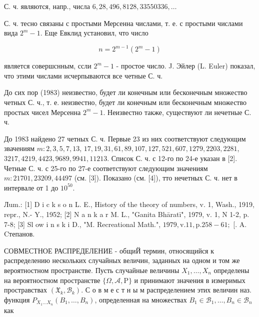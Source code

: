 \documentclass[10pt]{article}
\begin{document}
С. ч. являются, напр., числа $6,28,496,8128,33550336, \ldots$



С. ч. тесно связаны с простыми Мерсенна числами, т. е. с простыми числами вида $2^{m}-1$. Еще Евклид установил, что число



\[

n=2^{m-1}\left(2^{m}-1\right)

\]



является совершснным, ссли $2^{m}-1$ - простое число. J. Эйлер (L. Euler) показал, что этими числами исчерпываются все четные С. ч.



До сих пор (1983) неизвестно, будет ли конечным или бесконечным множество четных С. ч., т. е. неизвестно, будет ли конечным или бесконечным множество простых чисел Мерсенна $2^{m}-1$. Неизвестно также, существуют ли нечетные С. ч.



До 1983 найдено 27 четных С. ч. Первые 23 из них соответствуют следующим звачениям $m: 2,3,5,7,13$, $17,19,31,61,89,107,127,521,607,1279,2203,2281$, $3217,4219,4423,9689,9941,11213$. Список С. ч. с 12-го по 24-е указан в [2]. Четные С. ч. с 25-го по 27-е соответствуют следующим значениям $m: 21701,23209,44497$ (см. [3]). Показано (см. [4]), тто нечетных С. ч. нет в интервале от 1 до $10^{50}$.



Лum.: [1] D i c k s o n L. E., History of the theory of numbers, v. 1, Wash., 1919, repr., N.- Y., 1952; [2] N a n k a r M. L., "Ganita Bhāratī", 1979, v. 1, N 1-2, p. 7-8; [3] Sl ow i n s k i D., "M. Recreational Math.", $1979, \mathrm{v} .11, \mathrm{p} .258-61 ;$ [. A. Cтепанов.



СОВМЕСТНОЕ РАСПРЕДЕЛЕНИЕ - общиЙ термин, относящийся к распределению нескольких случайных величин, заданных на одном и том же вероятностном пространстве. Пусть случайные величины $X_{1}, \ldots, X_{n}$ определены на вероятностном пространстве $\{\Omega, \mathcal{A}, \mathrm{P}\}$ и принимают значения в измеримых простравствах $\left(\mathfrak{X}_{k}, \mathscr{B}_{k}\right)$. С о в м е с т н ы м распределением этих величин наз. функция $P_{X_{1} \ldots X_{n}}\left(B_{1}, \ldots, B_{n}\right)$, определенная на множествах $B_{1} \in \mathscr{B}_{1}, \ldots, B_{n} \in \mathscr{B}_{n}$ как
\end{document}
